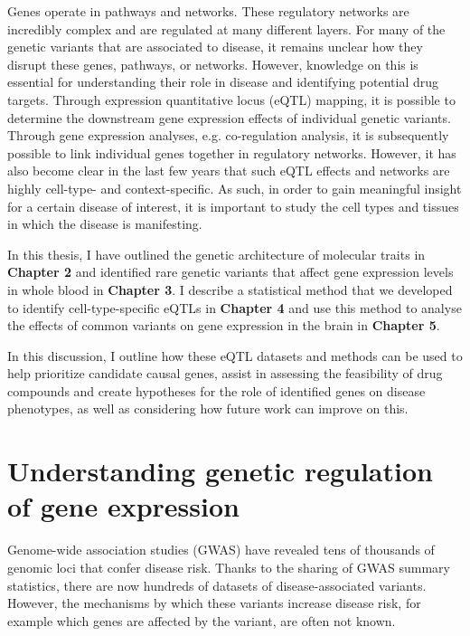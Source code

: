 Genes operate in pathways and networks. These regulatory networks are incredibly complex and are regulated at many different layers. For many of the genetic variants that are associated to disease, it remains unclear how they disrupt these genes, pathways, or networks. However, knowledge on this is essential for understanding their role in disease and identifying potential drug targets. Through expression quantitative locus (eQTL) mapping, it is possible to determine the downstream gene expression effects of individual genetic variants. Through gene expression analyses, e.g. co-regulation analysis, it is subsequently possible to link individual genes together in regulatory networks. However, it has also become clear in the last few years that such eQTL effects and networks are highly cell-type- and context-specific. As such, in order to gain meaningful insight for a certain disease of interest, it is important to study the cell types and tissues in which the disease is manifesting.


In this thesis, I have outlined the genetic architecture of molecular traits in \textbf{Chapter 2}\cite{claringbouldGeneticArchitectureMolecular2017} and identified rare genetic variants that affect gene expression levels in whole blood in \textbf{Chapter 3}\cite{kleinImbalancedExpressionPredicted2020}. I describe a statistical method that we developed to identify cell-type-specific eQTLs in \textbf{Chapter 4}\cite{raulaguirregamboaDeconvolutionBulkBlood2020} and use this method to analyse the effects of common variants on gene expression in the brain in \textbf{Chapter 5}.


In this discussion, I outline how these eQTL datasets and methods can be used to help prioritize candidate causal genes, assist in assessing the feasibility of drug compounds and create hypotheses for the role of identified genes on disease phenotypes, as well as considering how future work can improve on this.


\section{Understanding genetic regulation of gene expression}

Genome-wide association studies (GWAS) have revealed tens of thousands of genomic loci that confer disease risk. Thanks to the sharing of GWAS summary statistics, there are now hundreds of datasets of disease-associated variants\cite{visscher10YearsGWAS2017}. However, the mechanisms by which these variants increase disease risk, for example which genes are affected by the variant, are often not known.


